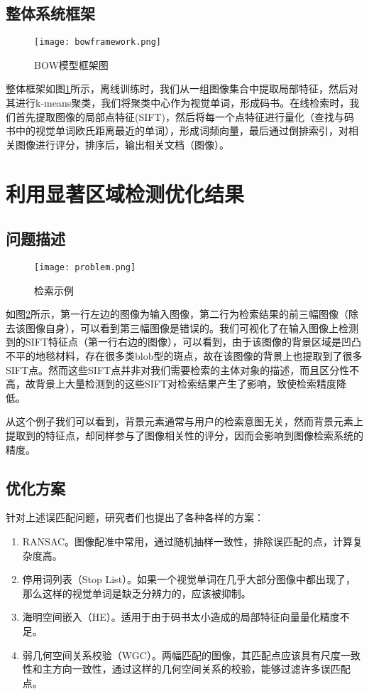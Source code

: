 \subsection{整体系统框架}
\begin{figure}[h]
\centering
\texttt{[image: bowframework.png]}
\caption{BOW模型框架图}\label{fig:bowframework}
\end{figure}
整体框架如图\ref{fig:bowframework}所示，离线训练时，我们从一组图像集合中提取局部特征，然后对其进行k-means聚类，我们将聚类中心作为视觉单词，形成码书。在线检索时，我们首先提取图像的局部点特征(SIFT)，然后将每一个点特征进行量化（查找与码书中的视觉单词欧氏距离最近的单词），形成词频向量，最后通过倒排索引，对相关图像进行评分，排序后，输出相关文档（图像）。

\section{利用显著区域检测优化结果}
\subsection{问题描述}
\begin{figure}[h]
\centering
\texttt{[image: problem.png]}
\caption{检索示例}\label{fig:problem}
\end{figure}

如图\ref{fig:problem}所示，第一行左边的图像为输入图像，第二行为检索结果的前三幅图像（除去该图像自身），可以看到第三幅图像是错误的。我们可视化了在输入图像上检测到的SIFT特征点（第一行右边的图像），可以看到，由于该图像的背景区域是凹凸不平的地毯材料，存在很多类blob型的斑点，故在该图像的背景上也提取到了很多SIFT点。然而这些SIFT点并非对我们需要检索的主体对象的描述，而且区分性不高，故背景上大量检测到的这些SIFT对检索结果产生了影响，致使检索精度降低。

从这个例子我们可以看到，背景元素通常与用户的检索意图无关，然而背景元素上提取到的特征点，却同样参与了图像相关性的评分，因而会影响到图像检索系统的精度。

\subsection{优化方案}
针对上述误匹配问题，研究者们也提出了各种各样的方案：
\begin{enumerate}
\item RANSAC。图像配准中常用，通过随机抽样一致性，排除误匹配的点，计算复杂度高。
\item 停用词列表（Stop List）\cite{sivic2003video}。如果一个视觉单词在几乎大部分图像中都出现了，那么这样的视觉单词是缺乏分辨力的，应该被抑制。
\item 海明空间嵌入（HE）\cite{jegou2008hamming}。适用于由于码书太小造成的局部特征向量量化精度不足。
\item 弱几何空间关系校验（WGC）\cite{jegou2010improving}。两幅匹配的图像，其匹配点应该具有尺度一致性和主方向一致性，通过这样的几何空间关系的校验，能够过滤许多误匹配点。
\end{enumerate}

